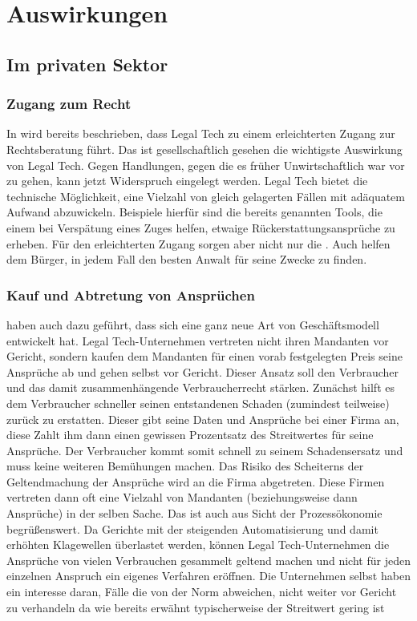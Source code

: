 \chapter{Auswirkungen}

\section{Im privaten Sektor}
\subsection{Zugang zum Recht}
In  wird bereits beschrieben, dass Legal Tech zu einem erleichterten Zugang zur Rechtsberatung führt. Das ist gesellschaftlich gesehen die wichtigste Auswirkung von Legal Tech. Gegen Handlungen, gegen die es früher Unwirtschaftlich war vor zu gehen, kann jetzt Widerspruch eingelegt werden. Legal Tech bietet die technische Möglichkeit, eine Vielzahl von gleich gelagerten Fällen mit adäquatem Aufwand abzuwickeln. Beispiele hierfür sind die bereits genannten Tools, die einem  bei Verspätung eines Zuges helfen, etwaige Rückerstattungsansprüche zu erheben.
Für den erleichterten Zugang sorgen aber nicht nur die . Auch  helfen dem Bürger, in jedem Fall den besten Anwalt für seine Zwecke zu finden. 

\subsection{Kauf und Abtretung von Ansprüchen}
 haben auch dazu geführt, dass sich eine ganz neue Art von Geschäftsmodell entwickelt hat. Legal Tech-Unternehmen vertreten nicht ihren Mandanten vor Gericht, sondern kaufen dem Mandanten für einen vorab festgelegten Preis seine Ansprüche ab und gehen selbst vor Gericht. Dieser Ansatz soll den Verbraucher und das damit zusammenhängende Verbraucherrecht stärken. Zunächst hilft es dem Verbraucher schneller seinen entstandenen Schaden (zumindest teilweise) zurück zu erstatten. Dieser gibt seine Daten und Ansprüche bei einer Firma an, diese Zahlt ihm dann einen gewissen Prozentsatz des Streitwertes für seine Ansprüche. Der Verbraucher kommt somit schnell zu seinem Schadensersatz und muss keine weiteren Bemühungen machen. Das Risiko des Scheiterns der Geltendmachung der Ansprüche wird an die Firma abgetreten. Diese Firmen vertreten dann oft eine Vielzahl von Mandanten (beziehungsweise dann Ansprüche) in der selben Sache. Das ist auch aus Sicht der Prozessökonomie begrüßenswert. Da Gerichte mit der steigenden Automatisierung und damit erhöhten Klagewellen überlastet werden, können Legal Tech-Unternehmen die Ansprüche von vielen Verbrauchen gesammelt geltend machen und nicht für jeden einzelnen Anspruch ein eigenes Verfahren eröffnen. Die Unternehmen selbst haben ein interesse daran, Fälle die von der Norm abweichen, nicht weiter vor Gericht zu verhandeln da wie bereits erwähnt typischerweise der Streitwert gering ist \cite{Engelhardt}
